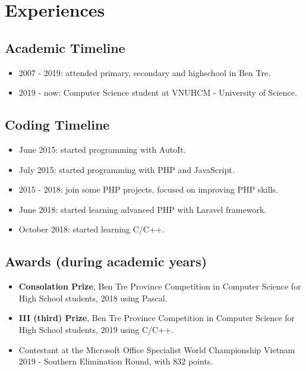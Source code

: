 \documentclass{article}
\begin{document}
    \section{Experiences}
        \subsection{Academic Timeline}
            \begin{itemize}
                \item 2007 - 2019: attended primary, secondary and highschool in Ben Tre.
                \item 2019 - now: Computer Science student at VNUHCM - University of Science.
            \end{itemize}

        \subsection{Coding Timeline}
            \begin{itemize}
                \item June 2015: started programming with AutoIt.
                \item July 2015: started programming with PHP and JavaScript.
                \item 2015 - 2018: join some PHP projects, focused on improving PHP skills.
                \item June 2018: started learning advanced PHP with Laravel framework.
                \item October 2018: started learning C/C++.
            \end{itemize}

        \subsection{Awards (during academic years)}
            \begin{itemize}
                \item {\textbf{Consolation Prize}}, Ben Tre Province Competition in Computer Science for High School students, 2018 using Pascal.
                \item {\textbf{III (third) Prize}}, Ben Tre Province Competition in Computer Science for High School students, 2019 using C/C++.
                \item Contestant at the Microsoft Office Specialist World Championship Vietnam 2019 - Southern Elimination Round, with 832 points.
            \end{itemize}
\end{document}
